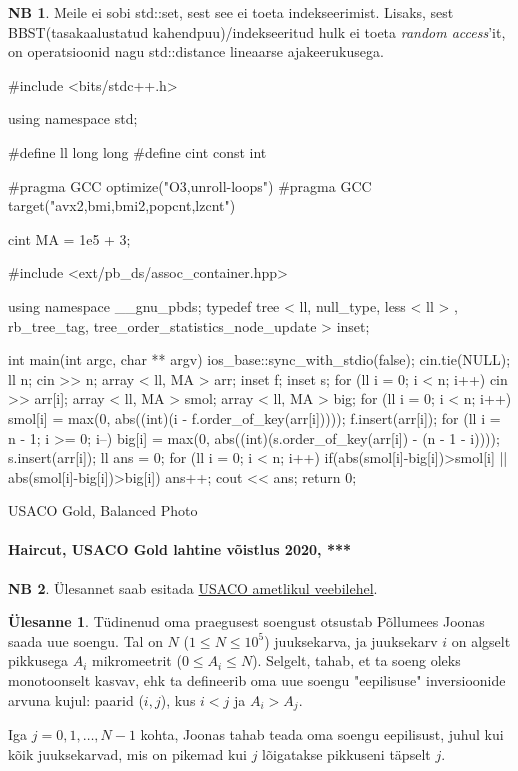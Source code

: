 \documentclass{trkut}
\theoremstyle{definition}
\newtheorem*{extra}{NB}
\newtheorem*{Text}{Ülesanne}
\begin{document}
\begin{extra}
Meile ei sobi  std::set, sest see ei toeta indekseerimist. Lisaks, sest BBST(tasakaalustatud kahendpuu)/indekseeritud hulk ei toeta\textit{ random access}'it, on operatsioonid nagu std::distance lineaarse ajakeerukusega.
\end{extra}

\begin{cclol}
#include <bits/stdc++.h>

using namespace std;

#define ll long long
#define cint
const int

#pragma GCC optimize("O3,unroll-loops")
#pragma GCC target("avx2,bmi,bmi2,popcnt,lzcnt")

cint MA = 1e5 + 3;

#include <ext/pb_ds/assoc_container.hpp>

using namespace __gnu_pbds;
typedef tree < ll, null_type, less < ll > , rb_tree_tag, 
tree_order_statistics_node_update > inset;

int main(int argc, char ** argv) {
  ios_base::sync_with_stdio(false);
  cin.tie(NULL);
  ll n;
  cin >> n;
  array < ll, MA > arr;
  inset f;
  inset s;
  for (ll i = 0; i < n; i++) cin >> arr[i];
  array < ll, MA > smol;
  array < ll, MA > big;
  for (ll i = 0; i < n; i++) {
    smol[i] = max(0, abs((int)(i - f.order_of_key(arr[i]))));
    f.insert(arr[i]);
  }
  for (ll i = n - 1; i >= 0; i--) {
    big[i] = max(0, abs((int)(s.order_of_key(arr[i]) - (n - 1 - i))));
    s.insert(arr[i]);
  }
  ll ans = 0;
  for (ll i = 0; i < n; i++) {
  if(abs(smol[i]-big[i])>smol[i] || abs(smol[i]-big[i])>big[i]) ans++;
  }
  cout << ans;
  return 0;
}
    \end{cclol}
    \begin{kk}[H]
    \caption{USACO Gold, Balanced Photo}%
    \end{kk}


\paragraph{Haircut, USACO Gold lahtine võistlus 2020, ***}
\begin{extra}
Ülesannet saab esitada \href{http://www.usaco.org/index.php?page=viewproblem2&cpid=1041}{USACO ametlikul veebilehel}.
\end{extra}
\begin{Text}
Tüdinenud oma praegusest soengust otsustab Põllumees Joonas saada uue soengu.  Tal on $N$ ($1\le N\le 10^5$) juuksekarva, ja juuksekarv $i$  on algselt pikkusega $A_i$ mikromeetrit  ($0\le A_i\le N$). Selgelt, tahab, et ta soeng oleks monotoonselt kasvav, ehk ta defineerib oma uue soengu "eepilisuse" inversioonide arvuna kujul: paarid ($i,j$), kus $i<j$ ja $A_i>A_j$.

Iga $j=0,1,…,N−1$ kohta,  Joonas tahab teada oma soengu eepilisust, juhul kui kõik juuksekarvad, mis on pikemad kui $j$ lõigatakse pikkuseni täpselt $j$.

\parencite{26}
\end{Text}
\end{document}
